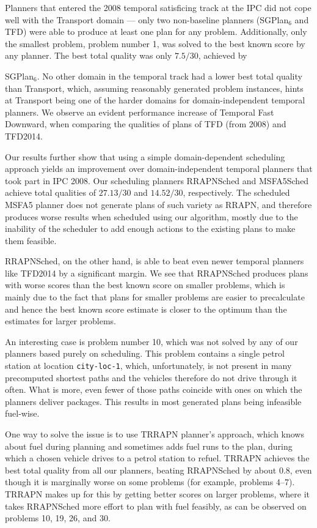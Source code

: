 Planners that entered the 2008 temporal satisficing track at the IPC did not cope well with the Transport domain
--- only two non-baseline planners (SGPlan$_6$ and TFD) were able to produce at least one plan
for any problem. Additionally, only the smallest problem, problem number 1, was solved
to the best known score by any planner.
The best total quality was only $7.5/30$, achieved by
{SGPlan$_6$. No other domain in the temporal track had a lower best total quality
than Transport, which, assuming reasonably generated problem instances, hints
at Transport being one of the harder domains for domain-independent temporal planners.
We observe an evident performance increase of Temporal Fast Downward,
when comparing the qualities of plans of TFD (from 2008) and TFD2014.

Our results further show that using a simple domain-dependent scheduling approach
yields an improvement over domain-independent temporal planners
that took part in IPC 2008. Our scheduling planners RRAPNSched
and MSFA5Sched achieve total qualities of $27.13/30$
and $14.52/30$, respectively.
The scheduled MSFA5 planner does not generate plans of such variety as RRAPN,
and therefore produces worse results when scheduled using our algorithm,
mostly due to the inability of the scheduler to add enough 
actions to the existing plans to make them feasible.

RRAPNSched, on the other hand, is able to beat even newer temporal planners like TFD2014
by a significant margin.
We see that RRAPNSched produces plans with worse scores than the best known score on smaller problems, which is mainly due to the fact that plans for smaller problems are easier to precalculate and hence the best known score estimate is closer
to the optimum than the estimates for larger problems.

An interesting case is problem number 10,
which was not solved by any of our planners based purely on scheduling.
This problem contains a single petrol station at location \texttt{city-loc-1},
which, unfortunately, is not present in many precomputed shortest
paths and the vehicles therefore do not drive through it often.
What is more, even fewer of those paths coincide with ones
on which the planners deliver packages.
This results in most generated plans being infeasible fuel-wise.

One way to solve the issue is to use TRRAPN planner's approach,
which knows about fuel during planning and 
sometimes adds fuel runs to the plan, during which a chosen vehicle
drives to a petrol station to refuel.
TRRAPN achieves the best total quality from all our planners,
beating RRAPNSched by about $0.8$,
even though it is marginally worse on some problems (for example, problems 4--7). TRRAPN makes up for this by getting better scores on
larger problems, where it takes RRAPNSched more effort to plan with fuel feasibly,
as can be observed on problems 10, 19, 26, and 30.

}
